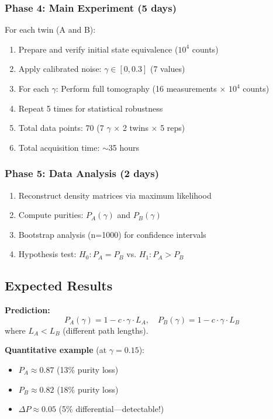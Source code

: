 \documentclass[11pt, onecolumn, letterpaper]{article}
\begin{document}
\subsubsection{Phase 4: Main Experiment (5 days)}
For each twin (A and B):
\begin{enumerate}
    \item Prepare and verify initial state equivalence ($10^4$ counts)
    \item Apply calibrated noise: $\gamma \in [0, 0.3]$ (7 values)
    \item For each $\gamma$: Perform full tomography (16 measurements $\times$ $10^4$ counts)
    \item Repeat 5 times for statistical robustness
    \item Total data points: 70 (7 $\gamma$ $\times$ 2 twins $\times$ 5 reps)
    \item Total acquisition time: $\sim$35 hours
\end{enumerate}

\subsubsection{Phase 5: Data Analysis (2 days)}
\begin{enumerate}
    \item Reconstruct density matrices via maximum likelihood
    \item Compute purities: $P_A(\gamma)$ and $P_B(\gamma)$
    \item Bootstrap analysis (n=1000) for confidence intervals
    \item Hypothesis test: $H_0: P_A = P_B$ vs. $H_1: P_A > P_B$
\end{enumerate}

\subsection{Expected Results}
\textbf{Prediction:}
\begin{equation}
P_A(\gamma) = 1 - c \cdot \gamma \cdot L_A, \quad P_B(\gamma) = 1 - c \cdot \gamma \cdot L_B
\end{equation}
where $L_A < L_B$ (different path lengths).

\textbf{Quantitative example} (at $\gamma = 0.15$):
\begin{itemize}
    \item $P_A \approx 0.87$ (13\% purity loss)
    \item $P_B \approx 0.82$ (18\% purity loss)
    \item $\Delta P \approx 0.05$ (5\% differential---detectable!)
\end{itemize}
\end{document}
